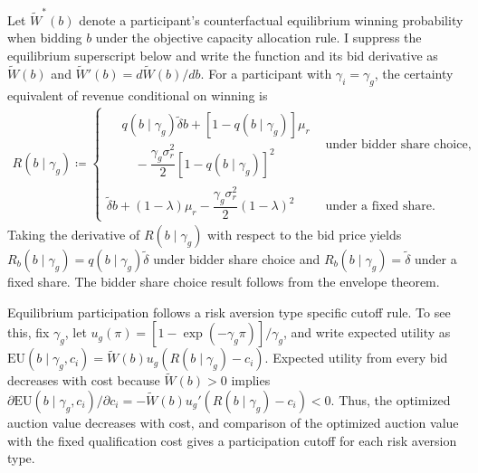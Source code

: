 \documentclass[12pt]{article}
\theoremstyle{definition} %
\begin{document}
Let $\widetilde W^\ast(b)$ denote a participant's counterfactual equilibrium winning probability when bidding $b$ under the objective capacity allocation rule. I suppress the equilibrium superscript below and write the function and its bid derivative as $\widetilde W(b)$ and $\widetilde W'(b)=d\widetilde W(b)/db$. For a participant with $\gamma_i=\gamma_g$, the certainty equivalent of revenue conditional on winning is
\begin{align*}
R(b\mid\gamma_g)
\coloneqq
\begin{cases}
\begin{aligned}
&q(b\mid\gamma_g)\tilde{\delta}b
+[1-q(b\mid\gamma_g)]\mu_r\\
&\quad-\dfrac{\gamma_g\sigma_r^2}{2}[1-q(b\mid\gamma_g)]^2
\end{aligned}
& \text{under bidder share choice},\\
\tilde{\delta}b+(1-\lambda)\mu_r
-\dfrac{\gamma_g\sigma_r^2}{2}(1-\lambda)^2
& \text{under a fixed share}.
\end{cases}
\end{align*}
Taking the derivative of $R(b\mid\gamma_g)$ with respect to the bid price yields $R_b(b\mid\gamma_g) = q(b\mid\gamma_g)\tilde{\delta}$ under bidder share choice and $R_b(b\mid\gamma_g) = \tilde{\delta}$ under a fixed share. The bidder share choice result follows from the envelope theorem.

Equilibrium participation follows a risk aversion type specific cutoff rule. To see this, fix $\gamma_g$, let $u_g(\pi)=[1-\exp(-\gamma_g\pi)]/\gamma_g$, and write expected utility as $\mathrm{EU}(b\mid\gamma_g,c_i)=\widetilde W(b)u_g(R(b\mid\gamma_g)-c_i)$. Expected utility from every bid decreases with cost because $\widetilde W(b)>0$ implies $\partial\mathrm{EU}(b\mid\gamma_g,c_i)/\partial c_i=-\widetilde W(b)u_g'(R(b\mid\gamma_g)-c_i)<0$. Thus, the optimized auction value decreases with cost, and comparison of the optimized auction value with the fixed qualification cost gives a participation cutoff for each risk aversion type.
\end{document}
